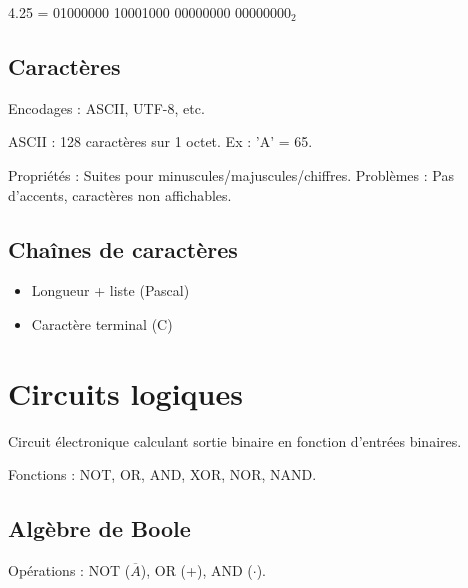 \documentclass[12pt,a4paper]{article}
\begin{document}
\begin{exemple}
4.25 = 01000000 10001000 00000000 00000000$_2$
\end{exemple}

\subsection{Caractères}

\begin{definition}
Encodages : ASCII, UTF-8, etc.
\end{definition}

\begin{remarque}
ASCII : 128 caractères sur 1 octet. Ex : 'A' = 65.
\end{remarque}

\begin{remarque}
Propriétés : Suites pour minuscules/majuscules/chiffres. Problèmes : Pas d'accents, caractères non affichables.
\end{remarque}

\subsection{Chaînes de caractères}
\begin{methode}
\begin{itemize}
    \item Longueur + liste (Pascal)
    \item Caractère terminal (C)
\end{itemize}
\end{methode}

\newpage
\section{Circuits logiques}

\begin{definition}
Circuit électronique calculant sortie binaire en fonction d'entrées binaires.
\end{definition}

\begin{definition}
Fonctions : NOT, OR, AND, XOR, NOR, NAND.
\end{definition}

\subsection{Algèbre de Boole}
\begin{definition}
Opérations : NOT ($\overline{A}$), OR (+), AND ($\cdot$).
\end{definition}
\end{document}
